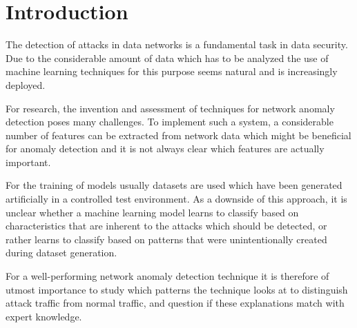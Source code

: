\documentclass[10pt,sigconf,letterpaper,dvipsnames]{acmart}
\begin{document}


\maketitle

\section{Introduction}
The detection of attacks in data networks is a fundamental task in data security. Due to the considerable amount of data which has to be analyzed the use of machine learning techniques for this purpose seems natural and is increasingly deployed.

For research, the invention and assessment of techniques for network anomaly detection poses many challenges. To implement such a system, a considerable number of features can be extracted from network data which might be beneficial for anomaly detection and it is not always clear which features are actually important.

For the training of models usually datasets are used which have been generated artificially in a controlled test environment. As a downside of this approach, it is unclear whether a machine learning model learns to classify based on characteristics that are inherent to the attacks which should be detected, or rather learns to classify based on patterns that were unintentionally created during dataset generation.

For a well-performing network anomaly detection technique it is therefore of utmost importance to study which patterns the technique looks at to distinguish attack traffic from normal traffic, and question if these explanations match with expert knowledge.
\end{document}
